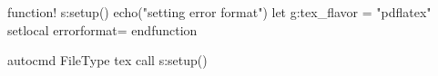 function! s:setup()
    echo("setting error format")
    let g:tex_flavor = "pdflatex"
    setlocal errorformat=%
endfunction

autocmd FileType tex call s:setup()
